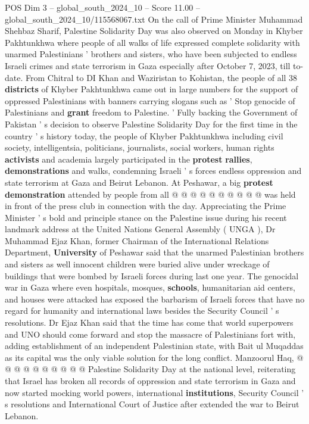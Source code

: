 \begin{textsample}{POS Dim 3 – global\_south\_2024\_10 – Score 11.00 – global\_south\_2024\_10/115568067.txt}  \label{ex:f3_pos_360}
On the call of Prime Minister Muhammad Shehbaz Sharif, Palestine Solidarity Day was also observed on Monday in Khyber Pakhtunkhwa where people of all walks of life expressed complete solidarity with unarmed Palestinians ' brothers and sisters, who have been subjected to endless Israeli crimes and state terrorism in Gaza especially after October 7, 2023, till to-date.
From Chitral to DI Khan and Waziristan to Kohistan, the people of all 38 \textbf{districts} of Khyber Pakhtunkhwa came out in large numbers for the support of oppressed Palestinians with banners carrying slogans such as ' Stop genocide of Palestinians and \textbf{grant} freedom to Palestine. ' Fully backing the Government of Pakistan ' s decision to observe Palestine Solidarity Day for the first time in the country ' s history today, the people of Khyber Pakhtunkhwa including civil society, intelligentsia, politicians, journalists, social workers, human rights \textbf{activists} and academia largely participated in the \textbf{protest} \textbf{rallies}, \textbf{demonstrations} and walks, condemning Israeli ' s forces endless oppression and state terrorism at Gaza and Beirut Lebanon.
At Peshawar, a big \textbf{protest} \textbf{demonstration} attended by people from all @ @ @ @ @ @ @ @ @ @ was held in front of the press club in connection with the day.
Appreciating the Prime Minister ' s bold and principle stance on the Palestine issue during his recent landmark address at the United Nations General Assembly ( UNGA ), Dr Muhammad Ejaz Khan, former Chairman of the International Relations Department, \textbf{University} of Peshawar said that the unarmed Palestinian brothers and sisters as well innocent children were buried alive under wreckage of buildings that were bombed by Israeli forces during last one year.
The genocidal war in Gaza where even hospitals, mosques, \textbf{schools}, humanitarian aid centers, and houses were attacked has exposed the barbarism of Israeli forces that have no regard for humanity and international laws besides the Security Council ' s resolutions.
Dr Ejaz Khan said that the time has come that world superpowers and UNO should come forward and stop the massacre of Palestinians fort with, adding establishment of an independent Palestinian state, with Bait ul Muqaddas as its capital was the only viable solution for the long conflict.
Manzoorul Haq, @ @ @ @ @ @ @ @ @ @ Palestine Solidarity Day at the national level, reiterating that Israel has broken all records of oppression and state terrorism in Gaza and now started mocking world powers, international \textbf{institutions}, Security Council ' s resolutions and International Court of Justice after extended the war to Beirut Lebanon.

\end{textsample}
